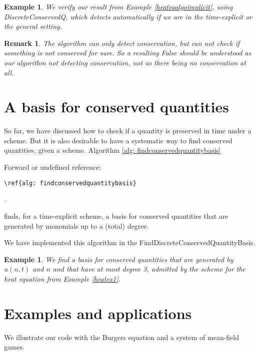 \documentclass[sigconf,twocolumn]{acmart}
\newcommand{\1}{{\chi}}
\numberwithin{equation}{section}
\theoremstyle{thmlemcorr}
\numberwithin{theorem}{section}
\theoremstyle{thmlemcorr*}
\theoremstyle{defi}
\theoremstyle{remexample}
\newtheorem{remark}[theorem]{Remark}
\newtheorem{example}[theorem]{Example}
\theoremstyle{ass}
\begin{document}
	\begin{example}
		We verify our result from Example \ref{heateqalgoimplicit}, using {\sc DiscreteConservedQ}, which detects automatically if we are in the time-explicit or the general setting.
		
		\begin{small}
		
		
		\end{small}
	\end{example}
\begin{remark}
	The algorithm can only detect conservation, but can not check if something is not conserved for sure. So a resulting {\sc False} should be understood as our algorithm not detecting conservation, not as there being no conservation at all.
\end{remark}
\section{A basis for conserved quantities}
\label{bfcq}
So far, we have discussed how to check if a quantity is preserved in time under a scheme. But it is also desirable to have a systematic way to find conserved quantities, given a scheme.
Algorithm \ref{alg: findconservedquantitybasis}
 {\color{red} Forward or undefined reference: \begin{verbatim}\ref{alg: findconservedquantitybasis}\end{verbatim}.}
 finds, for a time-explicit scheme, a basis for conserved quantities that are generated by monomials up to a (total) degree. 

We have implemented this algorithm in the {\sc FindDiscreteConservedQuantityBasis}.
\begin{example}
	We find a basis for conserved quantities that are generated by \(u(n,t)\) and \(n\) and that have at most degree 3, admitted by the scheme for the heat equation from Example \ref{heatex1}.
	
	\begin{small}
		
		
	\end{small}
\end{example}
\section{Examples and applications}
\label{eaa}
We illustrate our code with the Burgers equation and a system of mean-field games.
\end{document}
